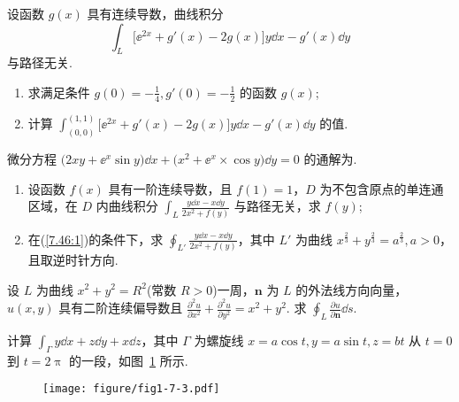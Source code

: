 	\begin{ti}
		设函数 $g(x)$ 具有连续导数，曲线积分
		\[
			\int_{L} \bigl[ \ee^{2x} + g'(x) - 2g(x) \bigr]y \dd{x} - g'(x) \dd{y}
		\]
		与路径无关.
		\begin{enumerate}
			\item 求满足条件 $g(0) = -\frac{1}{4}, g'(0) = -\frac{1}{2}$ 的函数 $g(x)$;
			\item 计算 $\int_{(0,0)}^{(1,1)} \bigl[ \ee^{2x} + g'(x) - 2g(x) \bigr]y \dd{x} - g'(x) \dd{y}$ 的值.
		\end{enumerate}
	\end{ti}

	\begin{ti}
		微分方程 $\bigl( 2xy + \ee^{x}\sin y \bigr) \dd{x} + \bigl( x^{2} + \ee^{x}\times \cos y \bigr) \dd{y} = 0$ 的通解为\htwo.
	\end{ti}

	\begin{ti}
		\begin{enumerate}
			\item 设函数 $f(x)$ 具有一阶连续导数，且 $f(1) = 1$，$D$ 为不包含原点的单连通区域，在 $D$ 内曲线积分 $\int_{L} \frac{y\dd{x} - x\dd{y}}{2x^{2} + f(y)}$ 与路径无关，求 $f(y)$;\label{7.46:1}
			\item 在(\ref{7.46:1})的条件下，求 $\oint_{L'} \frac{y\dd{x} - x\dd{y}}{2x^{2} + f(y)}$，其中 $L'$ 为曲线 $x^{\frac{2}{3}} + y^{\frac{2}{3}} = a^{\frac{2}{3}}, a > 0$，且取逆时针方向.
		\end{enumerate}
	\end{ti}

	\begin{ti}
		设 $L$ 为曲线 $x^{2} + y^{2} = R^{2}$(常数 $R > 0$)一周，$\bm n$ 为 $L$ 的外法线方向向量，$u(x,y)$ 具有二阶连续偏导数且 $\frac{\partial^{2}u}{\partial x^{2}} + \frac{\partial^{2}u}{\partial y^{2}} = x^{2} + y^{2}$. 求 $\oint_{L} \frac{\partial u}{\partial \bm n} \dd{s}$.
	\end{ti}

	\begin{ti}
		计算 $\int_{\varGamma} y\dd{x} + z\dd{y} + x\dd{z}$，其中 $\varGamma$ 为螺旋线 $x = a \cos t, y = a \sin t, z = bt$ 从 $t = 0$ 到 $t = 2\uppi$ 的一段，如图~\ref{fig:1.7.3} 所示.
		\begin{figure}[htbp]
			\centering
			\texttt{[image: figure/fig1-7-3.pdf]}
			\caption{}\label{fig:1.7.3}
		\end{figure}
	\end{ti}